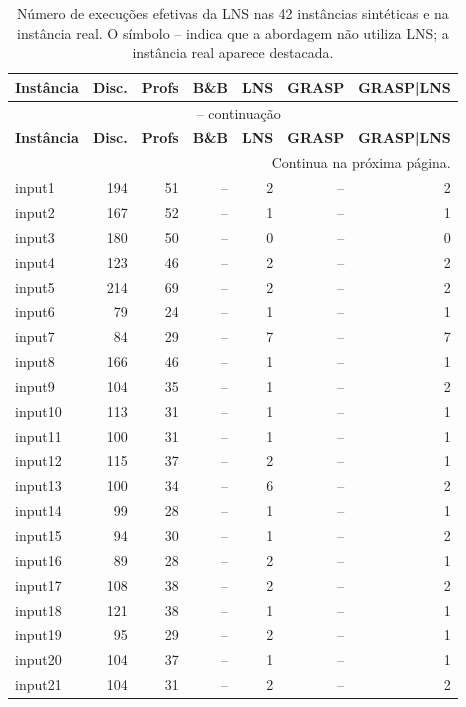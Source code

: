 \begingroup
\setlength{\tabcolsep}{3pt}
\scriptsize
\begin{longtable}{@{}lrrrrrr@{}}
\caption{Número de execuções efetivas da LNS nas 42 instâncias sintéticas e na instância real. O símbolo -- indica que a abordagem não utiliza LNS; a instância real aparece destacada.}\label{tab:geral_lns_executions}\\
\toprule
\textbf{Instância} & \textbf{Disc.} & \textbf{Profs} & \textbf{B\&B} & \textbf{LNS} & \textbf{GRASP} & \textbf{GRASP|LNS} \\
\midrule
\endfirsthead
\multicolumn{7}{c}{\tablename\ \thetable{} -- continuação}\\
\toprule
\textbf{Instância} & \textbf{Disc.} & \textbf{Profs} & \textbf{B\&B} & \textbf{LNS} & \textbf{GRASP} & \textbf{GRASP|LNS} \\
\midrule
\endhead
\midrule
\multicolumn{7}{r}{Continua na próxima página.}\\
\endfoot
\bottomrule
\endlastfoot
input1 & 194 & 51 & -- & 2 & -- & 2 \\
input2 & 167 & 52 & -- & 1 & -- & 1 \\
input3 & 180 & 50 & -- & 0 & -- & 0 \\
input4 & 123 & 46 & -- & 2 & -- & 2 \\
input5 & 214 & 69 & -- & 2 & -- & 2 \\
input6 & 79 & 24 & -- & 1 & -- & 1 \\
input7 & 84 & 29 & -- & 7 & -- & 7 \\
input8 & 166 & 46 & -- & 1 & -- & 1 \\
input9 & 104 & 35 & -- & 1 & -- & 2 \\
input10 & 113 & 31 & -- & 1 & -- & 1 \\
input11 & 100 & 31 & -- & 1 & -- & 1 \\
input12 & 115 & 37 & -- & 2 & -- & 1 \\
input13 & 100 & 34 & -- & 6 & -- & 2 \\
input14 & 99 & 28 & -- & 1 & -- & 1 \\
input15 & 94 & 30 & -- & 1 & -- & 2 \\
input16 & 89 & 28 & -- & 2 & -- & 1 \\
input17 & 108 & 38 & -- & 2 & -- & 2 \\
input18 & 121 & 38 & -- & 1 & -- & 1 \\
input19 & 95 & 29 & -- & 2 & -- & 1 \\
input20 & 104 & 37 & -- & 1 & -- & 1 \\
input21 & 104 & 31 & -- & 2 & -- & 2 \\

\end{longtable}
